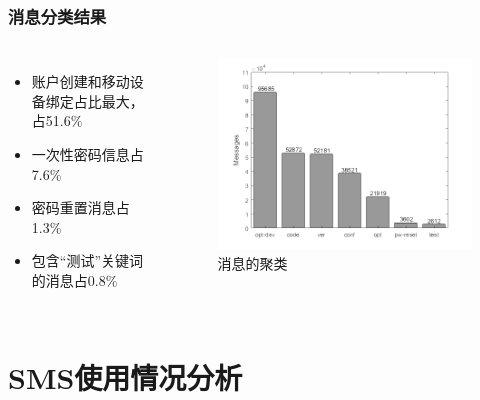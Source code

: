 \documentclass[10pt,aspectratio=43,mathserif]{beamer}
\begin{document}
        \begin{frame}
		  \frametitle{\textbf{消息分类结果}}
            \begin{columns}
                \footnotesize
                \begin{itemize}
                  \item 账户创建和移动设备绑定占比最大，占51.6\%
                  \item 一次性密码信息占7.6\%
                  \item 密码重置消息占1.3\%
                  \item 包含“测试”关键词的消息占0.8\%
                \end{itemize}

                \begin{figure}[!t]
                    \centering
                    \includegraphics[width=1.1\textwidth]{figures/figure4.png}
                    \caption{消息的聚类}
                    \label{figure3_OTT}
                \end{figure}
            \end{columns}
		\end{frame}



\section[分析]{SMS使用情况分析}
\end{document}
